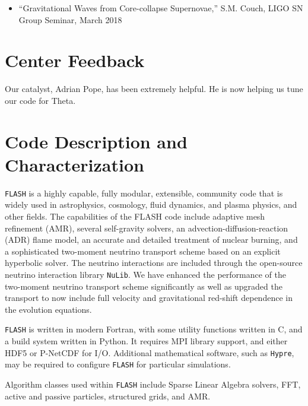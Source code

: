 \documentclass[12pt,titlepage]{article}
\begin{document}

\begin{itemize}
  \item ``Gravitational Waves from Core-collapse Supernovae,'' S.M. Couch, LIGO SN Group Seminar, March 2018
\end{itemize}



\section{Center Feedback}

Our catalyst, Adrian Pope, has been extremely helpful.
He is now helping us tune our code for Theta.


\section{Code Description and Characterization}

\texttt{FLASH} is a highly capable, fully modular, extensible,
community code that is widely used in astrophysics, cosmology, fluid
dynamics, and plasma physics, and other fields.  The capabilities of
the FLASH code include adaptive mesh refinement (AMR), several
self-gravity solvers, an advection-diffusion-reaction (ADR) flame
model, an accurate and detailed treatment of nuclear burning, and a
sophisticated two-moment neutrino transport scheme based on an
explicit hyperbolic solver.  The neutrino interactions are included
through the open-source neutrino interaction library
\texttt{NuLib}. We have enhanced the
performance of the two-moment neutrino transport scheme significantly
as well as upgraded the transport to now include full velocity and
gravitational red-shift dependence in the evolution equations.

\texttt{FLASH} is written in modern Fortran, with some utility
functions written in C, and a build system written in Python.  It
requires MPI library support, and either HDF5 or P-NetCDF for I/O.
Additional mathematical software, such as \texttt{Hypre}, may be
required to configure \texttt{FLASH} for particular simulations.

Algorithm classes used within \texttt{FLASH} include Sparse Linear
Algebra solvers, FFT, active and passive particles, structured grids,
and AMR.
\end{document}
